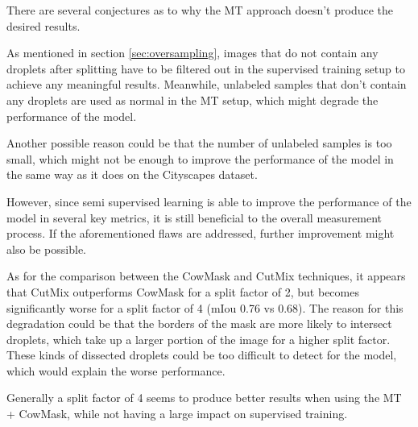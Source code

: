 There are several conjectures as to why the MT approach doesn't produce the desired results.

As mentioned in section \ref{sec:oversampling}, images that do not contain any droplets after splitting have to be filtered out in the supervised training setup to achieve any meaningful results.
Meanwhile, unlabeled samples that don't contain any droplets are used as normal in the MT setup, which might degrade the performance of the model.

Another possible reason could be that the number of unlabeled samples is too small, which might not be enough to improve the performance of the model in the same way as it does on the Cityscapes dataset.

However, since semi supervised learning is able to improve the performance of the model in several key metrics, it is still beneficial to the overall measurement process.
If the aforementioned flaws are addressed, further improvement might also be possible.

As for the comparison between the CowMask and CutMix techniques, it appears that CutMix outperforms CowMask for a split factor of 2, but becomes significantly worse for a split factor of 4 (mIou 0.76 vs 0.68).
The reason for this degradation could be that the borders of the mask are more likely to intersect droplets, which take up a larger portion of the image for a higher split factor.
These kinds of dissected droplets could be too difficult to detect for the model, which would explain the worse performance. 

Generally a split factor of 4 seems to produce better results when using the MT + CowMask, while not having a large impact on supervised training.

